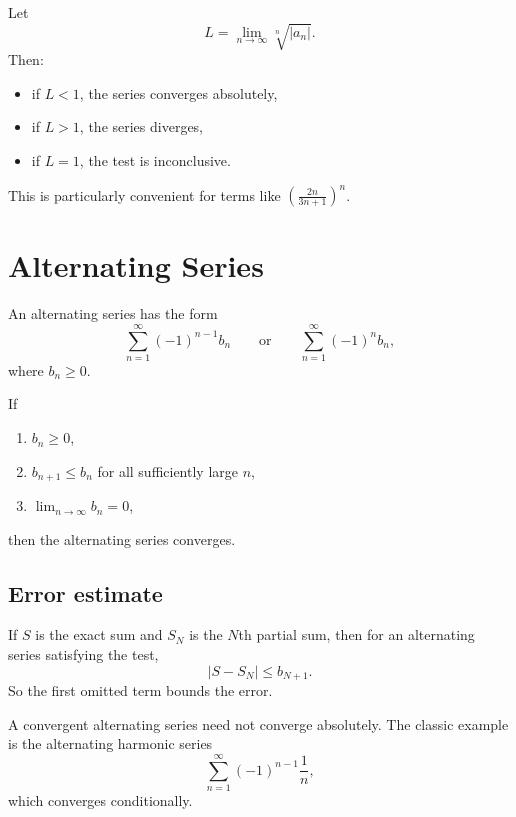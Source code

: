 \begin{theorem}
Let
$$L = \lim_{n\to\infty}\sqrt[n]{|a_n|}.$$ 
Then:
\begin{itemize}
    \item if $L<1$, the series converges absolutely,
    \item if $L>1$, the series diverges,
    \item if $L=1$, the test is inconclusive.
\end{itemize}
\end{theorem}

This is particularly convenient for terms like $(\frac{2n}{3n+1})^n$.

\section*{Alternating Series}

An alternating series has the form
$$\sum_{n=1}^{\infty} (-1)^{n-1}b_n \qquad \text{or} \qquad \sum_{n=1}^{\infty} (-1)^n b_n,$$
where $b_n\ge 0$.

\begin{theorem}
If
\begin{enumerate}[label=\arabic*.]
    \item $b_n\ge 0$,
    \item $b_{n+1}\le b_n$ for all sufficiently large $n$,
    \item $\lim_{n\to\infty} b_n = 0$,
\end{enumerate}
then the alternating series converges.
\end{theorem}

\subsection*{Error estimate}

If $S$ is the exact sum and $S_N$ is the $N$th partial sum, then for an alternating series satisfying the test,
$$|S-S_N| \le b_{N+1}.$$ 
So the first omitted term bounds the error.

\begin{remark}
A convergent alternating series need not converge absolutely. The classic example is the alternating harmonic series
$$\sum_{n=1}^{\infty} (-1)^{n-1}\frac1n,$$
which converges conditionally.
\end{remark}